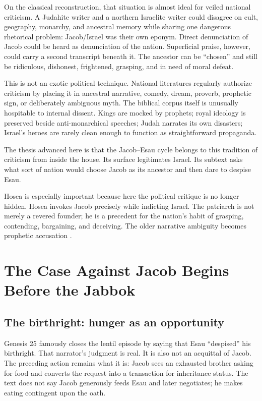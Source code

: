 On the classical reconstruction, that situation is almost ideal for veiled national criticism. A Judahite writer and a northern Israelite writer could disagree on cult, geography, monarchy, and ancestral memory while sharing one dangerous rhetorical problem: Jacob/Israel was their own eponym. Direct denunciation of Jacob could be heard as denunciation of the nation. Superficial praise, however, could carry a second transcript beneath it. The ancestor can be ``chosen'' and still be ridiculous, dishonest, frightened, grasping, and in need of moral defeat.

This is not an exotic political technique. National literatures regularly authorize criticism by placing it in ancestral narrative, comedy, dream, proverb, prophetic sign, or deliberately ambiguous myth. The biblical corpus itself is unusually hospitable to internal dissent. Kings are mocked by prophets; royal ideology is preserved beside anti-monarchical speeches; Judah narrates its own disasters; Israel's heroes are rarely clean enough to function as straightforward propaganda.

The thesis advanced here is that the Jacob--Esau cycle belongs to this tradition of criticism from inside the house. Its surface legitimates Israel. Its subtext asks what sort of nation would choose Jacob as its ancestor and then dare to despise Esau.

Hosea is especially important because here the political critique is no longer hidden. Hosea invokes Jacob precisely while indicting Israel. The patriarch is not merely a revered founder; he is a precedent for the nation's habit of grasping, contending, bargaining, and deceiving. The older narrative ambiguity becomes prophetic accusation \parencite{AndersenFreedman1980}.

\section{The Case Against Jacob Begins Before the Jabbok}

\subsection{The birthright: hunger as an opportunity}

Genesis 25 famously closes the lentil episode by saying that Esau ``despised'' his birthright. That narrator's judgment is real. It is also not an acquittal of Jacob. The preceding action remains what it is: Jacob sees an exhausted brother asking for food and converts the request into a transaction for inheritance status. The text does not say Jacob generously feeds Esau and later negotiates; he makes eating contingent upon the oath.


